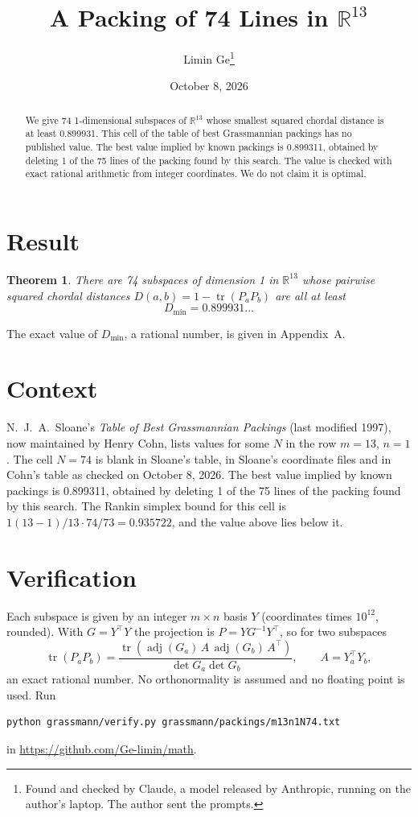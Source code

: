 \documentclass[11pt,a4paper]{article}
\title{A Packing of 74 Lines in $\mathbb{R}^{13}$}
\author{Limin Ge\thanks{Found and checked by Claude, a model released by Anthropic, running on the author's laptop. The author sent the prompts.}}
\date{October 8, 2026}
\newtheorem*{theorem}{Theorem}
\begin{document}
\maketitle
\begin{abstract}
We give 74 1-dimensional subspaces of $\mathbb{R}^{13}$ whose smallest squared chordal distance is at least 0.899931. This cell of the table of best Grassmannian packings has no published value. The best value implied by known packings is 0.899311, obtained by deleting 1 of the 75 lines of the packing found by this search. The value is checked with exact rational arithmetic from integer coordinates. We do not claim it is optimal.
\end{abstract}

\section{Result}
\begin{theorem}
There are 74 subspaces of dimension 1 in $\mathbb{R}^{13}$ whose pairwise squared chordal distances $D(a,b) = 1 - \operatorname{tr}(P_aP_b)$ are all at least
\[ D_{\min} = 0.899931\ldots \]
\end{theorem}
The exact value of $D_{\min}$, a rational number, is given in Appendix~A.


\section{Context}
N.~J.~A.~Sloane's \emph{Table of Best Grassmannian Packings} (last modified 1997), now maintained by Henry Cohn, lists values for some $N$ in the row $m=13$, $n=1$. The cell $N=74$ is blank in Sloane's table, in Sloane's coordinate files and in Cohn's table as checked on October 8, 2026. The best value implied by known packings is 0.899311, obtained by deleting 1 of the 75 lines of the packing found by this search. The Rankin simplex bound for this cell is $1(13-1)/13\cdot 74/73 = 0.935722$, and the value above lies below it.


\section{Verification}
Each subspace is given by an integer $m\times n$ basis $Y$ (coordinates times $10^{12}$, rounded). With $G=Y^\top Y$ the projection is $P=YG^{-1}Y^\top$, so for two subspaces
\[ \operatorname{tr}(P_aP_b)=\frac{\operatorname{tr}(\operatorname{adj}(G_a)\,A\,\operatorname{adj}(G_b)\,A^\top)}{\det G_a\det G_b},\qquad A=Y_a^\top Y_b, \]
an exact rational number. No orthonormality is assumed and no floating point is used. Run
\begin{verbatim}
python grassmann/verify.py grassmann/packings/m13n1N74.txt
\end{verbatim}
in \url{https://github.com/Ge-limin/math}.
\end{document}
